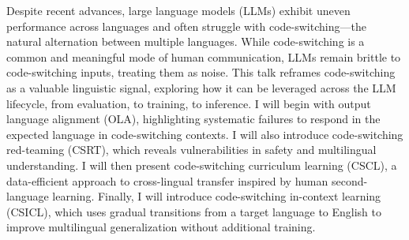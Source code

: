 Despite recent advances, large language models (LLMs) exhibit uneven performance across languages and often struggle with code-switching—the natural alternation between multiple languages. While code-switching is a common and meaningful mode of human communication, LLMs remain brittle to code-switching inputs, treating them as noise. This talk reframes code-switching as a valuable linguistic signal, exploring how it can be leveraged across the LLM lifecycle, from evaluation, to training, to inference. I will begin with output language alignment (OLA), highlighting systematic failures to respond in the expected language in code-switching contexts. I will also introduce code-switching red-teaming (CSRT), which reveals vulnerabilities in safety and multilingual understanding. I will then present code-switching curriculum learning (CSCL), a data-efficient approach to cross-lingual transfer inspired by human second-language learning. Finally, I will introduce code-switching in-context learning (CSICL), which uses gradual transitions from a target language to English to improve multilingual generalization without additional training.